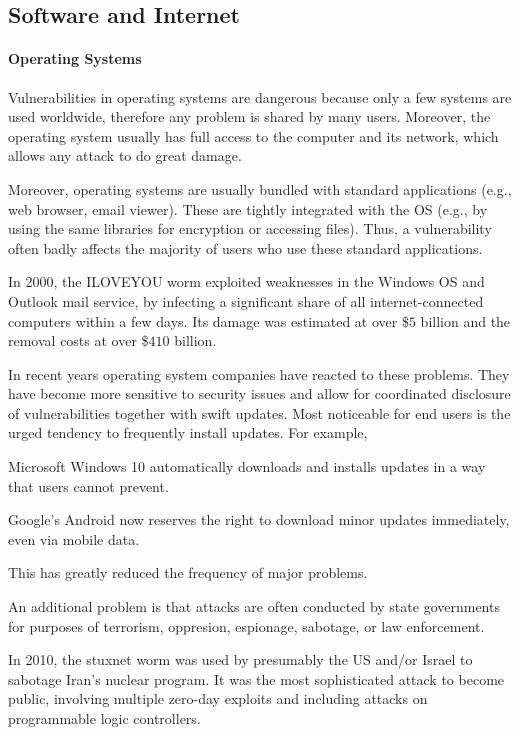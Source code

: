\subsection{Software and Internet}

\paragraph{Operating Systems}
Vulnerabilities in operating systems are dangerous because only a few systems are used worldwide, therefore any problem is shared by many users.
Moreover, the operating system usually has full access to the computer and its network, which allows any attack to do great damage.

Moreover, operating systems are usually bundled with standard applications (e.g., web browser, email viewer).
These are tightly integrated with the OS (e.g., by using the same libraries for encryption or accessing files).
Thus, a vulnerability often badly affects the majority of users who use these standard applications.

In 2000, the ILOVEYOU worm exploited weaknesses in the Windows OS and Outlook mail service, by infecting a significant share of all internet-connected computers within a few days.
Its damage was estimated at over \$$5$ billion and the removal costs at over \$$410$ billion.

In recent years operating system companies have reacted to these problems.
They have become more sensitive to security issues and allow for coordinated disclosure of vulnerabilities together with swift updates.
Most noticeable for end users is the urged tendency to frequently install updates.
For example,
\begin{compactitem}
\item Microsoft Windows 10 automatically downloads and installs updates in a way that users cannot prevent.
\item Google's Android now reserves the right to download minor updates immediately, even via mobile data.
\end{compactitem}
This has greatly reduced the frequency of major problems.

An additional problem is that attacks are often conducted by state governments for purposes of terrorism, oppresion, espionage, sabotage, or law enforcement.

In 2010, the stuxnet worm was used by presumably the US and/or Israel to sabotage Iran's nuclear program.
It was the most sophisticated attack to become public, involving multiple zero-day exploits and including attacks on programmable logic controllers.

